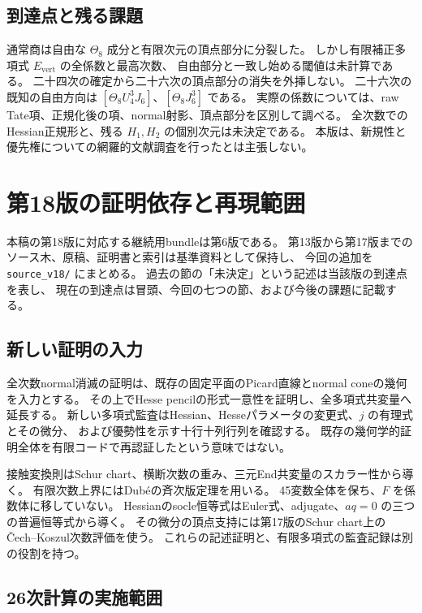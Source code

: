 \documentclass[a4paper,11pt]{ltjsarticle}
\theoremstyle{definition}
\begin{document}
\subsection{到達点と残る課題}

通常商は自由な $\Theta_8$ 成分と有限次元の頂点部分に分裂した。
しかし有限補正多項式 $E_{\mathrm{vert}}$ の全係数と最高次数、
自由部分と一致し始める閾値は未計算である。
二十四次の確定から二十六次の頂点部分の消失を外挿しない。
二十六次の既知の自由方向は
$[\Theta_8U_4^3J_6]$、$[\Theta_8J_6^3]$ である。
実際の係数については、raw Tate項、正規化後の項、normal射影、頂点部分を区別して調べる。
全次数でのHessian正規形と、残る $H_1,H_2$ の個別次元は未決定である。
本版は、新規性と優先権についての網羅的文献調査を行ったとは主張しない。


\section{第18版の証明依存と再現範囲}
\label{app:v18-reproducibility}

本稿の第18版に対応する継続用bundleは第6版である。
第13版から第17版までのソース木、原稿、証明書と索引は基準資料として保持し、
今回の追加を \nolinkurl{source_v18/} にまとめる。
過去の節の「未決定」という記述は当該版の到達点を表し、
現在の到達点は冒頭、今回の七つの節、および今後の課題に記載する。

\subsection{新しい証明の入力}

全次数normal消滅の証明は、既存の固定平面のPicard直線とnormal coneの幾何を入力とする。
その上でHesse pencilの形式一意性を証明し、全多項式共変量へ延長する。
新しい多項式監査はHessian、Hesseパラメータの変更式、$j$ の有理式とその微分、
および優勢性を示す十行十列行列を確認する。
既存の幾何学的証明全体を有限コードで再認証したという意味ではない。

接触変換則はSchur chart、横断次数の重み、三元End共変量のスカラー性から導く。
有限次数上界にはDub\'eの斉次版定理\cite[Theorem~8.2]{Dube1990}を用いる。
45変数全体を保ち、$F$ を係数体に移していない。
Hessianのsocle恒等式はEuler式、adjugate、$aq=0$ の三つの普遍恒等式から導く。
その微分の頂点支持には第17版のSchur chart上のČech--Koszul次数評価を使う。
これらの記述証明と、有限多項式の監査記録は別の役割を持つ。

\subsection{26次計算の実施範囲}
\end{document}
